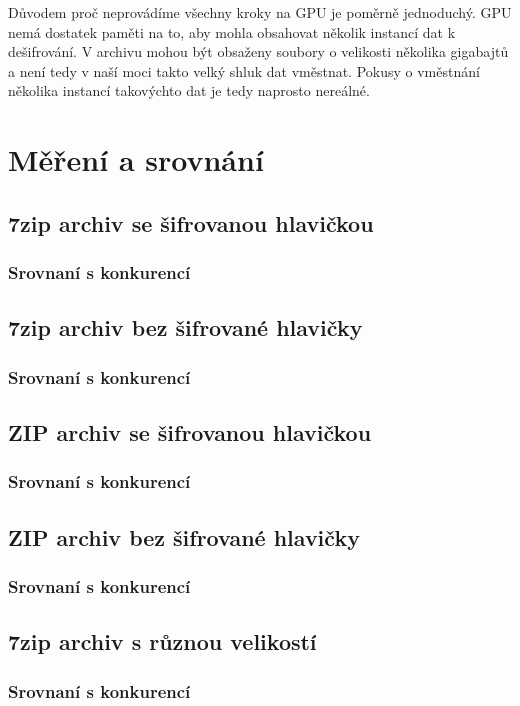 Důvodem proč neprovádíme všechny kroky na GPU je poměrně jednoduchý. GPU nemá dostatek paměti na
to, aby mohla obsahovat několik instancí dat k dešifrování. V archivu mohou být obsaženy soubory o
velikosti několika gigabajtů a není tedy v naší moci takto velký shluk dat vměstnat. Pokusy o
vměstnání několika instancí takovýchto dat je tedy naprosto nereálné. 

\chapter{Měření a srovnání}
\label{ch:mereni_a_srovnani}
\section{7zip archiv se šifrovanou hlavičkou}
\subsection{Srovnaní s konkurencí}
\section{7zip archiv bez šifrované hlavičky}
\subsection{Srovnaní s konkurencí}
\section{ZIP archiv se šifrovanou hlavičkou}
\subsection{Srovnaní s konkurencí}
\section{ZIP archiv bez šifrované hlavičky}
\subsection{Srovnaní s konkurencí}
\section{7zip archiv s různou velikostí}
\subsection{Srovnaní s konkurencí}
